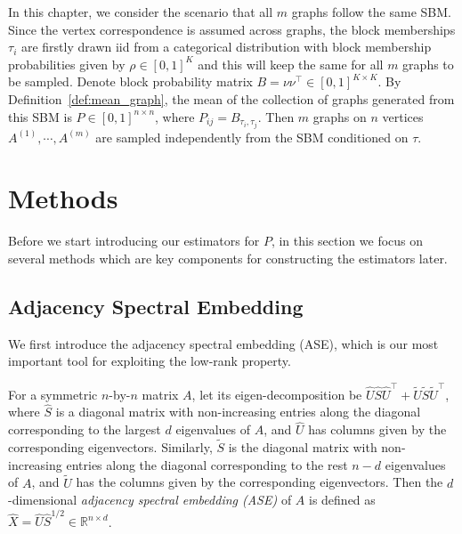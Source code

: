 In this chapter, we consider the scenario that all $m$ graphs follow the same SBM. Since the vertex correspondence is assumed across graphs, the block memberships $\tau_i$ are firstly drawn iid from a categorical distribution with block membership probabilities given by $\rho\in[0,1]^K$ and this will keep the same for all $m$ graphs to be sampled.
Denote block probability matrix $B = \nu \nu^{\top} \in [0, 1]^{K \times K}$. 
By Definition~\ref{def:mean_graph}, the mean of the collection of graphs generated from this SBM is $P \in [0, 1]^{n \times n}$, where $P_{ij} = B_{\tau_i, \tau_j}$.
Then $m$ graphs on $n$ vertices $A^{(1)}, \cdots, A^{(m)}$ are sampled independently from the SBM conditioned on $\tau$.





\section{Methods}
\label{sec:LLG_method}

Before we start introducing our estimators for $P$, in this section we focus on several methods which are key components for constructing the estimators later.

\subsection{Adjacency Spectral Embedding}
\label{sec:ASE}

We first introduce the adjacency spectral embedding (ASE), which is our most important tool for exploiting the low-rank property.

\begin{definition} 
\label{def:ASE}
For a symmetric $n$-by-$n$ matrix $A$, let its eigen-decomposition be $\hat{U} \hat{S} \hat{U}^{\top} + \tilde{U}\tilde{S}\tilde{U}^{\top}$, where $\hat{S}$ is a diagonal matrix with non-increasing entries along the diagonal corresponding to the largest $d$ eigenvalues of $A$, and $\hat{U}$ has columns given by the corresponding eigenvectors. Similarly, $\tilde{S}$ is the diagonal matrix with non-increasing entries along the diagonal corresponding to the rest $n - d$ eigenvalues of $A$, and $\tilde{U}$ has the columns given by the corresponding eigenvectors.
Then the $d$-dimensional {\em{adjacency spectral embedding (ASE)}} of $A$ is defined as $\hat{X}=\hat{U} \hat{S}^{1/2}\in \mathbb{R}^{n \times d}$.
\end{definition}


